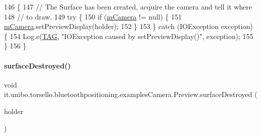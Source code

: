 \begin{DoxyCode}
146                                                      \{
147         \textcolor{comment}{// The Surface has been created, acquire the camera and tell it where}
148         \textcolor{comment}{// to draw.}
149         \textcolor{keywordflow}{try} \{
150             \textcolor{keywordflow}{if} (\hyperlink{classit_1_1unibo_1_1torsello_1_1bluetoothpositioning_1_1examplesCamera_1_1Preview_a1690c2d132a340b5726ef9712e961dd9_a1690c2d132a340b5726ef9712e961dd9}{mCamera} != null) \{
151                 \hyperlink{classit_1_1unibo_1_1torsello_1_1bluetoothpositioning_1_1examplesCamera_1_1Preview_a1690c2d132a340b5726ef9712e961dd9_a1690c2d132a340b5726ef9712e961dd9}{mCamera}.setPreviewDisplay(holder);
152             \}
153         \} \textcolor{keywordflow}{catch} (IOException exception) \{
154             Log.e(\hyperlink{classit_1_1unibo_1_1torsello_1_1bluetoothpositioning_1_1examplesCamera_1_1Preview_a0e05d509a5425eba210e8d1a816c1d42_a0e05d509a5425eba210e8d1a816c1d42}{TAG}, \textcolor{stringliteral}{"IOException caused by setPreviewDisplay()"}, exception);
155         \}
156     \}
\end{DoxyCode}
\hypertarget{classit_1_1unibo_1_1torsello_1_1bluetoothpositioning_1_1examplesCamera_1_1Preview_abed0494890fb81c8db6d62a28b20434b_abed0494890fb81c8db6d62a28b20434b}{}\label{classit_1_1unibo_1_1torsello_1_1bluetoothpositioning_1_1examplesCamera_1_1Preview_abed0494890fb81c8db6d62a28b20434b_abed0494890fb81c8db6d62a28b20434b} 
\paragraph{\texorpdfstring{surface\+Destroyed()}{surfaceDestroyed()}}
{\footnotesize\ttfamily void it.\+unibo.\+torsello.\+bluetoothpositioning.\+examples\+Camera.\+Preview.\+surface\+Destroyed (\begin{DoxyParamCaption}\item[{Surface\+Holder}]{holder }\end{DoxyParamCaption})}


